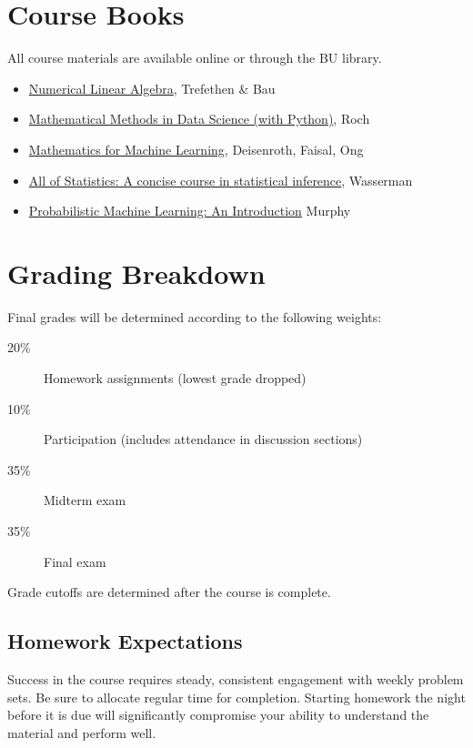 \documentclass[11pt]{article}
\begin{document}
\section*{Course Books}
All course materials are available online or through the BU library.
\begin{itemize}
\item \href{https://www.stat.uchicago.edu/~lekheng/courses/309/books/Trefethen-Bau.pdf}{Numerical Linear Algebra}, Trefethen \& Bau 
\item \href{https://mmids-textbook.github.io/index.html}{Mathematical Methods in Data Science (with Python)}, Roch
\item \href{https://mml-book.github.io/book/mml-book.pdf}{Mathematics for Machine Learning}, Deisenroth, Faisal, Ong
\item  \href{library.bu.edu}{All of Statistics: A concise course in statistical inference}, Wasserman
\item \href{https://probml.github.io/pml-book/book1.html}{Probabilistic Machine Learning: An Introduction} Murphy
\end{itemize}

\section*{Grading Breakdown}

Final grades will be determined according to the following weights:

\begin{description}
    \item[20\%] Homework assignments (lowest grade dropped)
    \item[10\%] Participation (includes attendance in discussion sections)
    \item[35\%] Midterm exam
    \item[35\%] Final exam
\end{description}

Grade cutoffs are determined after the course is complete.

\subsection*{Homework Expectations}

Success in the course requires steady, consistent engagement with weekly problem sets. Be sure to allocate regular time for completion. Starting homework the night before it is due will significantly compromise your ability to understand the material and perform well.
\end{document}
